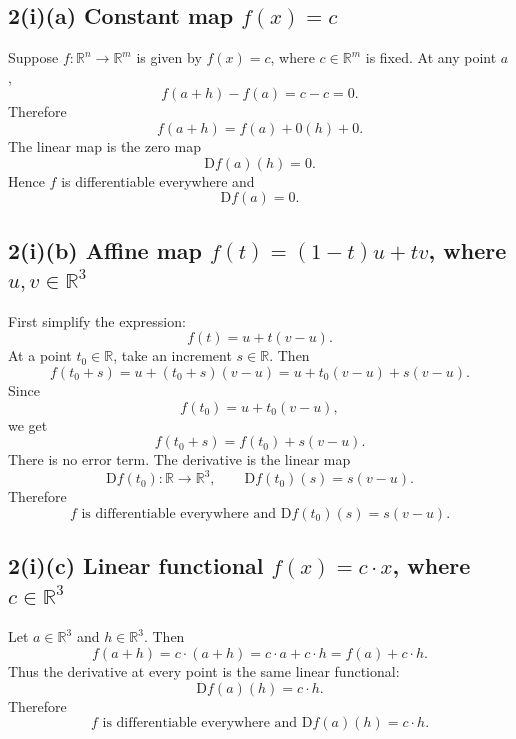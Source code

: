 \documentclass[11pt]{article}
\newcommand{\R}{\mathbb{R}}
\newcommand{\D}{\mathrm{D}}
\begin{document}
\subsection*{2(i)(a) Constant map $f(x)=c$}
Suppose $f:\R^n\to\R^m$ is given by $f(x)=c$, where $c\in\R^m$ is fixed.  At any point $a$,
\[
 f(a+h)-f(a)=c-c=0.
\]
Therefore
\[
 f(a+h)=f(a)+0(h)+0.
\]
The linear map is the zero map
\[
 \D f(a)(h)=0.
\]
Hence $f$ is differentiable everywhere and
\[
 \boxed{\D f(a)=0.}
\]

\subsection*{2(i)(b) Affine map $f(t)=(1-t)u+tv$, where $u,v\in\R^3$}
First simplify the expression:
\[
 f(t)=u+t(v-u).
\]
At a point $t_0\in\R$, take an increment $s\in\R$. Then
\[
 f(t_0+s)=u+(t_0+s)(v-u)
 =u+t_0(v-u)+s(v-u).
\]
Since
\[
 f(t_0)=u+t_0(v-u),
\]
we get
\[
 f(t_0+s)=f(t_0)+s(v-u).
\]
There is no error term.  The derivative is the linear map
\[
 \D f(t_0):\R\to\R^3,
 \qquad
 \D f(t_0)(s)=s(v-u).
\]
Therefore
\[
 \boxed{f\text{ is differentiable everywhere and }\D f(t_0)(s)=s(v-u).}
\]

\begin{center}
\end{center}

\subsection*{2(i)(c) Linear functional $f(x)=c\cdot x$, where $c\in\R^3$}
Let $a\in\R^3$ and $h\in\R^3$. Then
\[
 f(a+h)=c\cdot(a+h)=c\cdot a+c\cdot h=f(a)+c\cdot h.
\]
Thus the derivative at every point is the same linear functional:
\[
 \D f(a)(h)=c\cdot h.
\]
Therefore
\[
 \boxed{f\text{ is differentiable everywhere and }\D f(a)(h)=c\cdot h.}
\]
\end{document}

